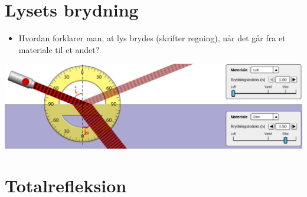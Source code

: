 \documentclass[a4paper, 12pt]{article}
\begin{document}
\vfill
\newpage

\section*{Lysets brydning}
\label{sec:orgde9ff30}
\begin{minipage}{0.3\linewidth}
\begin{itemize}
\item Hvordan forklarer man, at lys brydes (skrifter regning), når det går fra et materiale til et andet?
\end{itemize}
\end{minipage}
\vline
\begin{minipage}{0.68\linewidth}
\begin{center}
\includegraphics[width=.9\linewidth]{./img/laser_luft_glas_i_og_b.png}
\end{center}
\end{minipage}

\vfill



\section*{Totalrefleksion}
\label{sec:org9574cd7}
\end{document}
